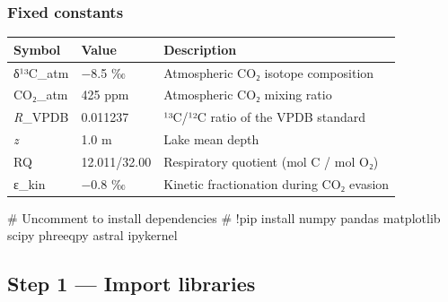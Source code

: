 \documentclass[
  letterpaper,
  DIV=11,
  numbers=noendperiod]{scrartcl}
\newenvironment{Shaded}{\begin{snugshade}}{\end{snugshade}}
\newcommand{\CommentTok}[1]{\textcolor[rgb]{0.37,0.37,0.37}{#1}}
\newcounter{none} %
\begin{document}
\subsubsection{Fixed constants}\label{fixed-constants}

{\def\LTcaptype{none} %
\begin{longtable}[]{@{}lll@{}}
\toprule\noalign{}
Symbol & Value & Description \\
\midrule\noalign{}
\endhead
\bottomrule\noalign{}
\endlastfoot
δ¹³C\_atm & −8.5 ‰ & Atmospheric CO₂ isotope composition \\
CO₂\_atm & 425 ppm & Atmospheric CO₂ mixing ratio \\
\emph{R}\_VPDB & 0.011237 & ¹³C/¹²C ratio of the VPDB standard \\
\emph{z} & 1.0 m & Lake mean depth \\
RQ & 12.011/32.00 & Respiratory quotient (mol C / mol O₂) \\
ε\_kin & −0.8 ‰ & Kinetic fractionation during CO₂ evasion \\
\end{longtable}
}

\begin{Shaded}
\begin{Highlighting}[]
\CommentTok{\# Uncomment to install dependencies}
\CommentTok{\# !pip install numpy pandas matplotlib scipy phreeqpy astral ipykernel}
\end{Highlighting}
\end{Shaded}

\subsection{Step 1 --- Import libraries}\label{step-1-import-libraries}
\end{document}
